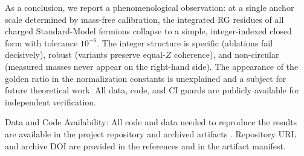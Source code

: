 \documentclass[aps,prd,onecolumn,amsmath,amssymb,superscriptaddress,nofootinbib,showpacs,showkeys]{revtex4-2}
\begin{document}
As a conclusion, we report a phenomenological observation: at a single anchor scale determined by mass-free calibration, the integrated RG residues of all charged Standard-Model fermions collapse to a simple, integer-indexed closed form with tolerance $10^{-6}$. The integer structure is specific (ablations fail decisively), robust (variants preserve equal-$Z$ coherence), and non-circular (measured masses never appear on the right-hand side). The appearance of the golden ratio in the normalization constants is unexplained and a subject for future theoretical work. All data, code, and CI guards are publicly available for independent verification.

%











%
\vspace{0.5cm}
Data and Code Availability:  
All code and data needed to reproduce the results are available in the project repository and archived artifacts \cite{fundamental-masses-repo}. Repository URL and archive DOI are provided in the references and in the artifact manifest.
\end{document}
